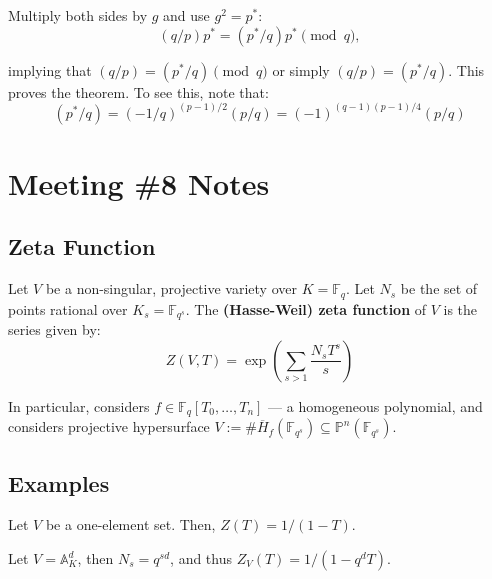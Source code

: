 \documentclass{template}
\begin{document}
Multiply both sides by $g$ and use $g^2=p^*$:
\begin{equation*}
    (q/p)p^* = (p^*/q)p^* \pmod{q},
\end{equation*}

implying that $(q/p)=(p^*/q) \pmod{q}$ or simply $(q/p)=(p^*/q)$. This proves the 
theorem. To see this, note that:
\begin{equation*}
    (p^*/q) = (-1/q)^{(p-1)/2}(p/q) = (-1)^{(q-1)(p-1)/4}(p/q)
\end{equation*}

\section{Meeting \#8 Notes}
\subsection{Zeta Function}

\begin{definition}
    Let $V$ be a non-singular, projective variety over $K=\mathbb{F}_q$. Let
    $N_s$ be the set of points rational over $K_s = \mathbb{F}_{q^s}$. The
    \textbf{(Hasse-Weil) zeta function} of $V$ is the series given by:
    \begin{equation*}
        Z(V, T) = \exp\left(\sum_{s>1} \frac{N_sT^s}{s}\right)
    \end{equation*}
\end{definition}

In particular, \cite{ireland} considers $f \in \mathbb{F}_q[T_0,\dots,T_n]$ ---
a homogeneous polynomial, and considers projective hypersurface $V :=
\#\overline{H}_f(\mathbb{F}_{q^s}) \subseteq \mathbb{P}^n(\mathbb{F}_{q^s})$.

\subsection{Examples}

\begin{example}
    Let $V$ be a one-element set. Then, $Z(T)=1/(1-T)$.
\end{example}

\begin{example}
    Let $V=\mathbb{A}_K^d$, then $N_s = q^{sd}$, and thus $Z_V(T) =
    1/(1-q^dT)$.
\end{example}
\end{document}
